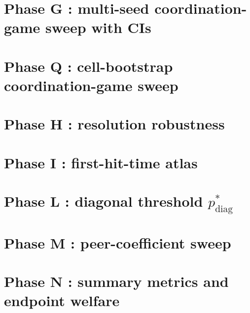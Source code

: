 \documentclass[11pt]{article}
\begin{document}


\section{Phase G : multi-seed coordination-game sweep with CIs}\label{sec:phase-g}



\section{Phase Q : cell-bootstrap coordination-game sweep}\label{sec:phase-q}



\section{Phase H : resolution robustness}\label{sec:phase-h}



\section{Phase I : first-hit-time atlas}\label{sec:phase-i}



\section{Phase L : diagonal threshold $p^*_{\mathrm{diag}}$}\label{sec:phase-l}



\section{Phase M : peer-coefficient sweep}\label{sec:phase-m}



\section{Phase N : summary metrics and endpoint welfare}\label{sec:phase-n}
\end{document}
